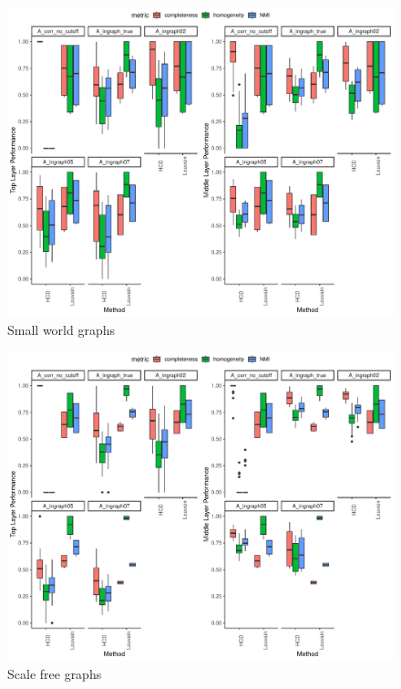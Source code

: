 \documentclass[
]{article}
\begin{document}
\begin{figure}
\centering
\includegraphics{Lab_report_3_13_2024_files/figure-latex/unnamed-chunk-3-1.pdf}
\caption{Small world graphs}
\end{figure}

\begin{figure}
\centering
\includegraphics{Lab_report_3_13_2024_files/figure-latex/unnamed-chunk-4-1.pdf}
\caption{Scale free graphs}
\end{figure}
\end{document}
